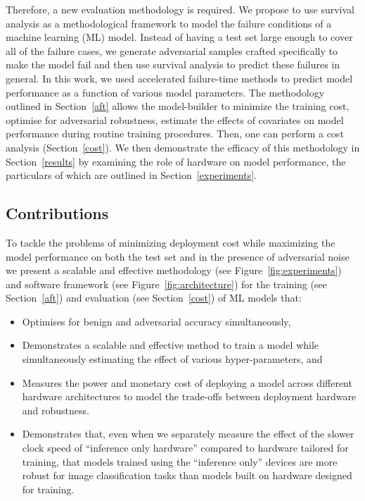\documentclass[sn-mathphys-num]{sn-jnl}%
\begin{document}
Therefore, a new evaluation methodology is required.
We propose to use survival analysis as a methodological framework to model the failure conditions of a machine learning (ML) model. Instead of having a test set large enough to cover all of the failure cases, we generate adversarial samples crafted specifically to make the model fail and then use survival analysis to predict these failures in general.
In this work, we used accelerated failure-time methods to predict model performance as a function of various model parameters. The methodology outlined in Section~\ref{aft} allows the model-builder to minimize the training cost, optimise for adversarial robustness, estimate the effects of covariates on model performance during routine training procedures. Then, one can perform a cost analysis (Section~\ref{cost}). We then demonstrate the efficacy of this methodology in Section~\ref{results} by examining the role of hardware on model performance, the particulars of which are outlined in Section~\ref{experiments}.


\subsection{Contributions}
To tackle the problems of minimizing deployment cost while maximizing the model performance on both the test set and in the presence of adversarial noise we present a scalable and effective methodology (see  Figure~\ref{fig:experiments}) and software framework (see Figure~\ref{fig:architecture}) for the training (see Section~\ref{aft}) and evaluation (see Section~\ref{cost}) of ML models that:
\begin{itemize}
    \item Optimises for benign and adversarial accuracy simultaneously,
    \item Demonstrates a scalable and effective method to train a model while simultaneously estimating the effect of various hyper-parameters, and
    \item Measures the power and monetary cost of deploying a model across different hardware architectures to model the trade-offs between deployment hardware and robustness.
    \item Demonstrates that, even when we separately measure the effect of the slower clock speed of ``inference only hardware'' compared to hardware tailored for training, that models trained using the ``inference only'' devices are more robust for image classification tasks than models built on hardware designed for training.
\end{itemize}
\end{document}
